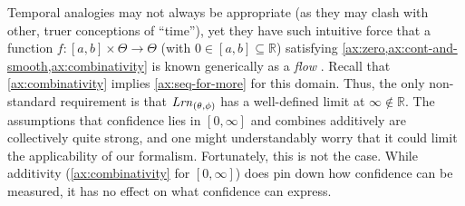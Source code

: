 Temporal analogies may not always be appropriate
(as they may clash with other, truer conceptions of ``time''),
yet they have such intuitive force that 
a function
$f: [a,b] \times \Theta \to \Theta$  
	(with $0 \in [a,b] \subseteq \mathbb R$)
satisfying \cref{ax:zero,ax:cont-and-smooth,ax:combinativity}
is known generically as a \emph{flow} \parencite{lee2013smooth}.
%
Recall that \cref{ax:combinativity} implies \cref{ax:seq-for-more} 
	for this domain.
Thus, the only non-standard requirement is that $\mathit{Lrn}_{(\theta,\phi)}$ has a well-defined limit at $\infty \notin\mathbb R$. 
%
The assumptions that confidence lies in $[0,\infty]$ and combines
additively are collectively quite strong, and one might understandably
worry that it could limit the applicability of our formalism.
Fortunately, this is not the case.
While 
additivity (\cref{ax:combinativity} for $[0,\infty]$) 
does pin down how confidence
can be measured, it has no effect on what confidence can express.

